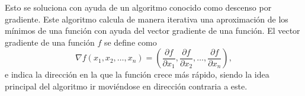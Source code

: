 		Esto se soluciona con ayuda de un algoritmo conocido como descenso por gradiente. Este algoritmo calcula de manera iterativa una aproximación de los mínimos de una función con ayuda del vector gradiente de una función. El vector gradiente de una función $f$ se define como 
		$$
		\nabla f(x_1, x_2, \hdots, x_n) = \left(\frac{\partial f}{\partial x_1}, \frac{\partial f}{\partial x_2}, \hdots, \frac{\partial f}{\partial x_n}\right), 
		$$
		e indica la dirección en la que la función crece más rápido, siendo la idea principal del algoritmo ir moviéndose en dirección contraria a este. 
		
		
		